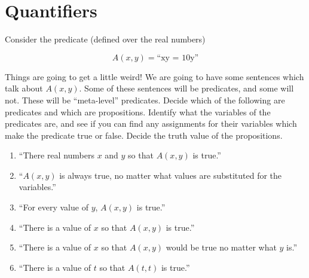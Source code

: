 \section{Quantifiers}


\begin{xca}

Consider the predicate (defined over the real numbers)

\[
A(x,y) = \textrm{``xy = 10y''}
\]

Things are going to get a little weird!  We are going to have some sentences which talk about $A(x,y)$.  Some of these sentences will be predicates, and some will not.  These will be ``meta-level'' predicates.  Decide which of the following are predicates and which are propositions. Identify what the variables of the predicates are, and see if you can find any assignments for their variables which make the predicate true or false.  Decide the truth value of the propositions.

\begin{enumerate}
		\item ``There real numbers $x$ and $y$ so that $A(x,y)$ is true.''
		\item ``$A(x,y)$ is always true, no matter what values are substituted for the variables.''
	    \item  ``For every value of  $y$,  $A(x,y)$ is true.''
		\item ``There is a value of $x$ so that $A(x,y)$ is true.''
		\item ``There is a value of $x$ so that $A(x,y)$ would be true no matter what $y$ is.''
		\item ``There is a value of $t$ so that $A(t,t)$ is true.''
	\end{enumerate}
\end{xca}

